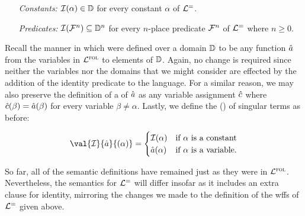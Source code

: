 \begin{enumerate}[leftmargin=1.5in]
  \item[\it Constants:] $\mathcal{I}(\alpha)\in\mathbb{D}$ for every constant $\alpha$ of $\mathcal{L}^{=}$. 
  \item[\it Predicates:] $\mathcal{I}(\mathcal{F}^n)\subseteq\mathbb{D}^n$ for every $n$-place predicate $\mathcal{F}^n$ of $\mathcal{L}^{=}$ where $n\geq 0$.
\end{enumerate}


Recall the manner in which  were defined over a domain $\mathbb{D}$ to be any function $\hat{a}$ from the variables in $\mathcal{L}^{\textsc{fol}}$ to elements of $\mathbb{D}$.
Again, no change is required since neither the variables nor the domains that we might consider are effected by the addition of the identity predicate to the language.
For a similar reason, we may also preserve the definition of a  of $\hat{a}$ as any variable assignment $\hat{c}$ where $\hat{c}(\beta)=\hat{a}(\beta)$ for every variable $\beta\neq\alpha$.
Lastly, we define the  () of singular terms as before:

\vspace{-.2in}
\begin{align*}
  \val{\I}{\va{a}}{(\alpha)}=
    \begin{cases}
      \I(\alpha) & \text{if } \alpha \text{ is a constant} \\
      \va{a}(\alpha) & \text{if } \alpha \text{ is a variable.}
    \end{cases}
\end{align*}

So far, all of the semantic definitions have remained just as they were in $\mathcal{L}^{\textsc{fol}}$.
Nevertheless, the semantics for $\mathcal{L}^{=}$ will differ insofar as it includes an extra clause for identity, mirroring the changes we made to the definition of the wffs of $\mathcal{L}^{=}$ given above. 

